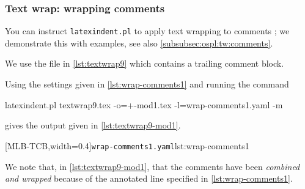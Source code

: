 \documentclass[10pt]{article}
\begin{document}
\subsubsection{Text wrap: wrapping comments}\label{subsubsec:tw:comments}
 You can instruct \texttt{latexindent.pl} to apply text wrapping to comments
 ; we demonstrate this with examples,
 see also \cref{subsubsec:ospl:tw:comments}.  

 \begin{example}
 We use the file in \cref{lst:textwrap9} which contains a trailing comment block.


 Using the settings given in \cref{lst:wrap-comments1} and running the command

 \begin{commandshell}
latexindent.pl textwrap9.tex -o=+-mod1.tex -l=wrap-comments1.yaml -m
   \end{commandshell}

 gives the output given in \cref{lst:textwrap9-mod1}.

 \begin{cmhtcbraster}[raster columns=2,
   raster left skip=-1.5cm,
   raster right skip=-0cm,
   raster column skip=.06\linewidth]
  [MLB-TCB,width=0.4\linewidth]{\texttt{wrap-comments1.yaml}}{lst:wrap-comments1}
 \end{cmhtcbraster}

 We note that, in \cref{lst:textwrap9-mod1}, that the comments have been \emph{combined
 and wrapped} because of the annotated line specified in \cref{lst:wrap-comments1}.
 \end{example}
\end{document}
